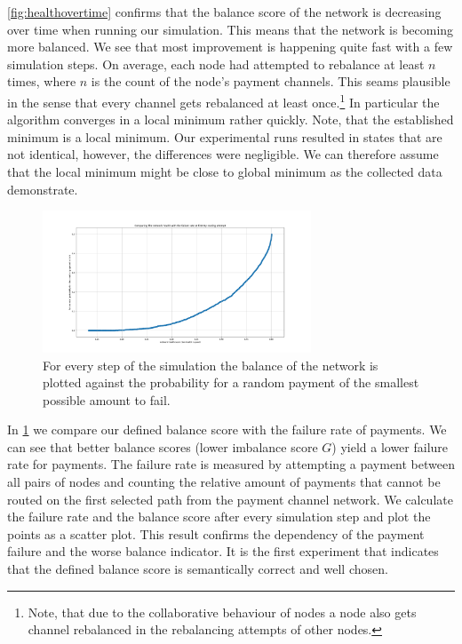 \documentclass[a4paper]{paper}
\begin{document}
\cref{fig:healthovertime} confirms that the balance score of the network is decreasing over time when running our simulation.
This means that the network is becoming more balanced.
We see that most improvement is happening quite fast with a few simulation steps.
On average, each node had attempted to rebalance at least $n$ times, where $n$ is the count of the node's payment channels.
This seams plausible in the sense that every channel gets rebalanced at least once.\footnote{Note, that due to the collaborative behaviour of nodes a node also gets channel rebalanced in the rebalancing attempts of other nodes.} 
In particular the algorithm converges in a local minimum rather quickly.
Note, that the established minimum is a local minimum. 
Our experimental runs resulted in states that are not identical, however, the differences were negligible. 
We can therefore assume that the local minimum might be close to global minimum as the collected data demonstrate.

\begin{figure}
 \centering
 \includegraphics[width=8cm]{code/results/routabilityTest/health vs payment rate.png}
 \caption{For every step of the simulation the balance of the network is plotted against the probability for a random payment of the smallest possible amount to fail.}
 \label{fig:healthVsFailurerate}
\end{figure}

In \cref{fig:healthVsFailurerate} we compare our defined balance score with the failure rate of payments.
We can see that better balance scores (lower imbalance score $G$) yield a lower failure rate for payments.
The failure rate is measured by attempting a payment between all pairs of nodes and counting the relative amount of payments that cannot be routed on the first selected path from the payment channel network.
We calculate the failure rate and the balance score after every simulation step and plot the points as a scatter plot.
This result confirms the dependency of the payment failure and the worse balance indicator. It is the first experiment that indicates that the defined balance score is semantically correct and well chosen. 
\end{document}
